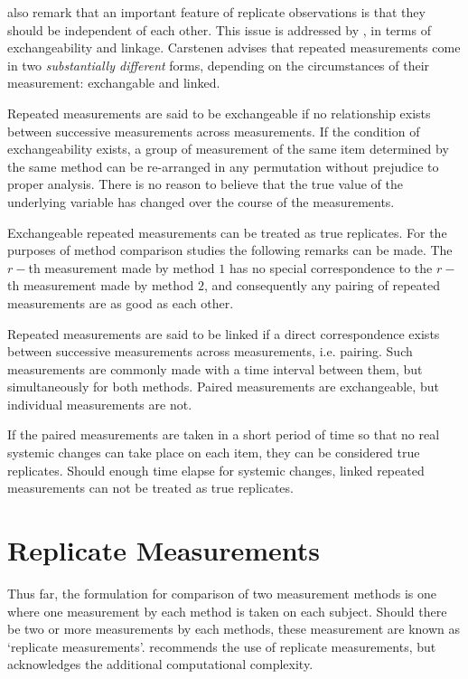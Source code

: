 \documentclass[12pt, a4paper]{report}
\theoremstyle{plain}
\theoremstyle{definition}
\theoremstyle{remark}
\begin{document}
	\newpage
	\citet{BA99} also remark that an important feature of replicate observations is that they should be independent
	of each other. This issue is addressed by \citet{BXC2010}, in terms of exchangeability and linkage. Carstenen advises that repeated measurements come in two \emph{substantially different} forms, depending on the circumstances of their measurement: exchangable and linked.
	
	Repeated measurements are said to be exchangeable if no relationship exists between successive measurements across measurements. If the condition of exchangeability exists, a group of measurement of the same item determined by the same method can be re-arranged in any permutation without prejudice to proper analysis. There is no reason to believe that the true value of the underlying variable has changed over the course of the measurements.
	
	Exchangeable repeated measurements can be treated as true replicates. For the purposes of method comparison studies the following remarks can be made. The $r-$th measurement made by method $1$ has no special correspondence to the $r-$th measurement made by method $2$, and consequently any pairing of repeated measurements are as good as each other.
	
	
	
	Repeated measurements are said to be linked if a direct correspondence exists between successive measurements across measurements, i.e. pairing. Such measurements are commonly made with a time interval between them, but simultaneously for both methods. Paired measurements are exchangeable, but individual measurements are not.
	
	If the paired measurements are taken
	in a short period of time so that no real systemic changes can take place on each item, they can be considered true replicates.
	Should enough time elapse for systemic changes, linked repeated measurements can not be treated as true replicates.
	
	
	\section{Replicate Measurements}
	
	Thus far, the formulation for comparison of two measurement
	methods is one where one measurement by each method is taken on
	each subject. Should there be two or more measurements by each
	methods, these measurement are known as `replicate measurements'.
	\citet{BXC2008} recommends the use of replicate measurements, but
	acknowledges the additional computational complexity.
	
\end{document}
